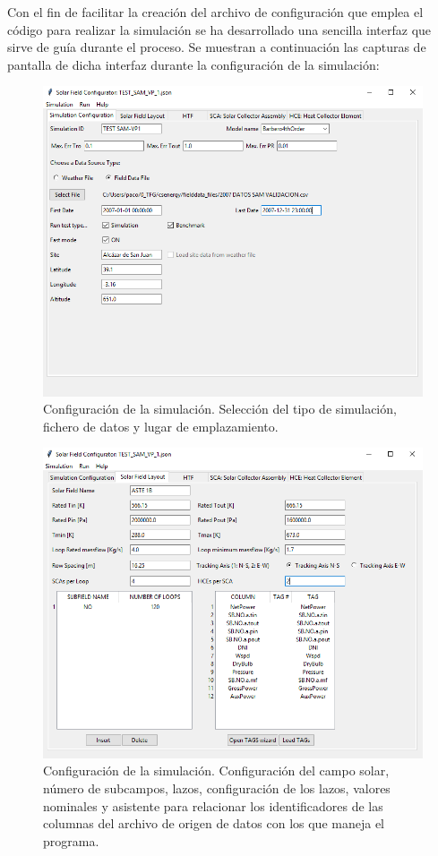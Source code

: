 \documentclass[11pt]{article}
\begin{document}
Con el fin de facilitar la creación del archivo de configuración que
emplea el código para realizar la simulación se ha desarrollado una
sencilla interfaz que sirve de guía durante el proceso. Se muestran a
continuación las capturas de pantalla de dicha interfaz durante la
configuración de la simulación:

\begin{figure}
\includegraphics[scale=0.8]{images/interface01.png}
\caption{Configuración de la simulación. Selección del tipo de simulación, fichero de datos y lugar de emplazamiento.} 
\label{fig:interface01}
\end{figure}

\begin{figure}
\includegraphics[scale=0.8]{images/interface02.png}
\caption{Configuración de la simulación. Configuración del campo solar, número de subcampos, lazos, configuración de los lazos, valores nominales y asistente para relacionar los identificadores de las columnas del archivo de origen de datos con los que maneja el programa.} 
\label{fig:interface02}
\end{figure}
\end{document}
